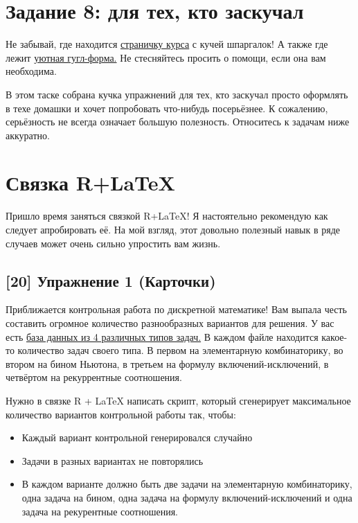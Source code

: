\documentclass[12pt, a4paper, oneside]{article}
\begin{document}
\section*{Задание 8:  для тех, кто заскучал  }

Не забывай, где находится  \href{https://fulyankin.github.io/LaTeX/}{страничку курса} с кучей шпаргалок! А также где лежит \href{https://docs.google.com/forms/d/e/1FAIpQLSe11kxKVfv07iCL1E9yNX7ll9swKImiVwRr1H70lslGzInRSg/viewform}{уютная гугл-форма.} Не стесняйтесь просить о помощи, если она вам необходима.

В этом таске собрана кучка упражнений для тех, кто заскучал просто оформлять в техе домашки и хочет попробовать что-нибудь посерьёзнее.  К сожалению, серьёзность не всегда означает большую полезность. Относитесь к задачам ниже аккуратно. 

\section*{Связка R+LaTeX}

Пришло время заняться связкой R+LaTeX! Я настоятельно рекомендую как следует апробировать её. На мой взгляд, этот довольно полезный навык в ряде случаев может очень сильно упростить вам жизнь.

\subsection*{[20] Упражнение 1 (Карточки)}

Приближается контрольная работа по дискретной математике! Вам выпала честь составить огромное количество разнообразных вариантов для решения. У вас есть  \href{https://github.com/FUlyankin/LaTeX/tree/master/Logi_2018/Homework_2018/hw_7_baza_zadach.zip}{база данных из 4 различных типов задач.}   В каждом файле находится какое-то количество задач своего типа. В первом на элементарную комбинаторику, во втором на бином Ньютона, в третьем на формулу включений-исключений, в четвёртом на рекуррентные соотношения.

Нужно в связке R + \LaTeX{} написать скрипт, который сгенерирует максимальное количество вариантов контрольной работы так, чтобы:

\begin{itemize}
\item Каждый вариант контрольной генерировался случайно
\item Задачи в разных вариантах не повторялись
\item В каждом варианте должно быть две задачи на элементарную комбинаторику, одна задача на бином, одна задача на формулу включений-исключений и одна задача на рекурентные соотношения.
\end{itemize}
\end{document}
